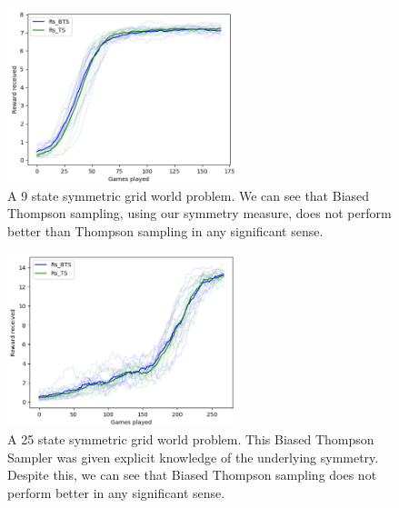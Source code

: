 



\begin{figure}[h!]
  \centering
  \includegraphics[width=0.6\textwidth,height=0.3\textheight]{../../pictures/figures/mdp-9-implicit.png}
  \caption{A 9 state symmetric grid world problem.
	We can see that Biased Thompson sampling, using our symmetry measure, does not perform better than Thompson sampling in any significant sense.}
	\label{fig:map-bts}
\end{figure}

\begin{figure}[h!]
  \centering
  \includegraphics[width=0.6\textwidth,height=0.3\textheight]{../../pictures/figures/mdp-25-explicit.png}
  \caption{A 25 state symmetric grid world problem.
	This Biased Thompson Sampler was given explicit knowledge of the underlying symmetry.
	Despite this, we can see that Biased Thompson sampling does not perform better in any significant sense.}
	\label{fig:explicit-sym}
\end{figure}

